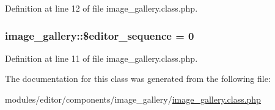 Definition at line 12 of file image\+\_\+gallery.\+class.\+php.

\hypertarget{classimage__gallery_a63124b017697df694664efada4edd0be}{
\subsubsection[{\$editor\+\_\+sequence}]{\setlength{\rightskip}{0pt plus 5cm}image\+\_\+gallery\+::\$editor\+\_\+sequence = 0}}\label{classimage__gallery_a63124b017697df694664efada4edd0be}


Definition at line 11 of file image\+\_\+gallery.\+class.\+php.



The documentation for this class was generated from the following file\+:\begin{DoxyCompactItemize}
\item 
modules/editor/components/image\+\_\+gallery/\hyperlink{image__gallery_8class_8php}{image\+\_\+gallery.\+class.\+php}\end{DoxyCompactItemize}
